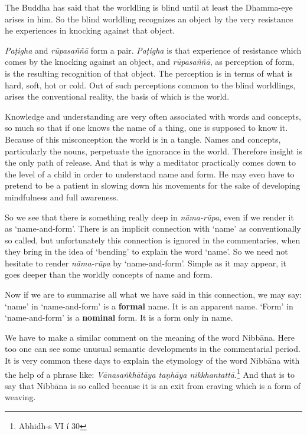 The Buddha has said that the worldling is blind until at least the Dhamma-eye arises in him. So the blind worldling recognizes an object by the very resistance he experiences in knocking against that object.

\emph{Paṭigha} and \emph{rūpasaññā} form a pair. \emph{Paṭigha} is that experience of resistance which comes by the knocking against an object, and \emph{rūpasaññā}, as perception of form, is the resulting recognition of that object. The perception is in terms of what is hard, soft, hot or cold. Out of such perceptions common to the blind worldlings, arises the conventional reality, the basis of which is the world.

Knowledge and understanding are very often associated with words and concepts, so much so that if one knows the name of a thing, one is supposed to know it. Because of this misconception the world is in a tangle. Names and concepts, particularly the nouns, perpetuate the ignorance in the world. Therefore insight is the only path of release. And that is why a meditator practically comes down to the level of a child in order to understand name and form. He may even have to pretend to be a patient in slowing down his movements for the sake of developing mindfulness and full awareness.

So we see that there is something really deep in \emph{nāma-rūpa}, even if we render it as `name-and-form'. There is an implicit connection with `name' as conventionally so called, but unfortunately this connection is ignored in the commentaries, when they bring in the idea of `bending' to explain the word `name'. So we need not hesitate to render \emph{nāma-rūpa} by `name-and-form'. Simple as it may appear, it goes deeper than the worldly concepts of name and form.

Now if we are to summarise all what we have said in this connection, we may say: `name' in `name-and-form' is a \textbf{formal} name. It is an apparent name. `Form' in `name-and-form' is a \textbf{nominal} form. It is a form only in name.

We have to make a similar comment on the meaning of the word Nibbāna. Here too one can see some unusual semantic developments in the commentarial period. It is very common these days to explain the etymology of the word Nibbāna with the help of a phrase like: \emph{Vānasaṅkhātāya taṇhāya nikkhantattā}.\footnote{Abhidh-s VI í 30} And that is to say that Nibbāna is so called because it is an exit from craving which is a form of weaving.

